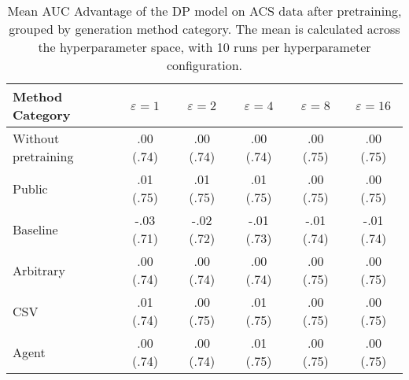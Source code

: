 \begin{table}[h!]
    \centering
    \caption{Mean AUC Advantage of the DP model on ACS data after pretraining, grouped by generation method category. The mean is calculated across the hyperparameter space, with 10 runs per hyperparameter configuration.}
    \label{tab:epsilon_comparison}
    \begin{tabular}{lccccc}
    \toprule
    Method Category & $\varepsilon=1$ & $\varepsilon=2$ & $\varepsilon=4$ & $\varepsilon=8$ & $\varepsilon=16$ \\
    \midrule
    Without pretraining & .00 {\small (.74)} & .00 {\small (.74)} & .00 {\small (.74)} & .00 {\small (.75)} & .00 {\small (.75)} \\
    \arrayrulecolor{black!50!}\midrule
    Public & \cellcolor{gold!30}.01 {\small (.75)} & \cellcolor{gold!30}.01 {\small (.75)} & \cellcolor{gold!30}.01 {\small (.75)} & \cellcolor{silver!30}.00 {\small (.75)} & \cellcolor{gold!30}.00 {\small (.75)} \\
    \arrayrulecolor{black!50!}\midrule
    Baseline & -.03 {\small (.71)} & -.02 {\small (.72)} & -.01 {\small (.73)} & -.01 {\small (.74)} & -.01 {\small (.74)} \\
    \arrayrulecolor{black!50!}\midrule
    Arbitrary & .00 {\small (.74)} & .00 {\small (.74)} & .00 {\small (.74)} & .00 {\small (.75)} & \cellcolor{bronze!30}.00 {\small (.75)} \\
    \arrayrulecolor{black!50!}\midrule
    CSV & \cellcolor{silver!30}.01 {\small (.74)} & \cellcolor{silver!30}.00 {\small (.75)} & \cellcolor{silver!30}.01 {\small (.75)} & \cellcolor{gold!30}.00 {\small (.75)} & \cellcolor{gold!30}.00 {\small (.75)} \\
    Agent & \cellcolor{bronze!30}.00 {\small (.74)} & \cellcolor{bronze!30}.00 {\small (.74)} & \cellcolor{bronze!30}.01 {\small (.75)} & \cellcolor{bronze!30}.00 {\small (.75)} & \cellcolor{silver!30}.00 {\small (.75)} \\
    \bottomrule
    \end{tabular}
\end{table}